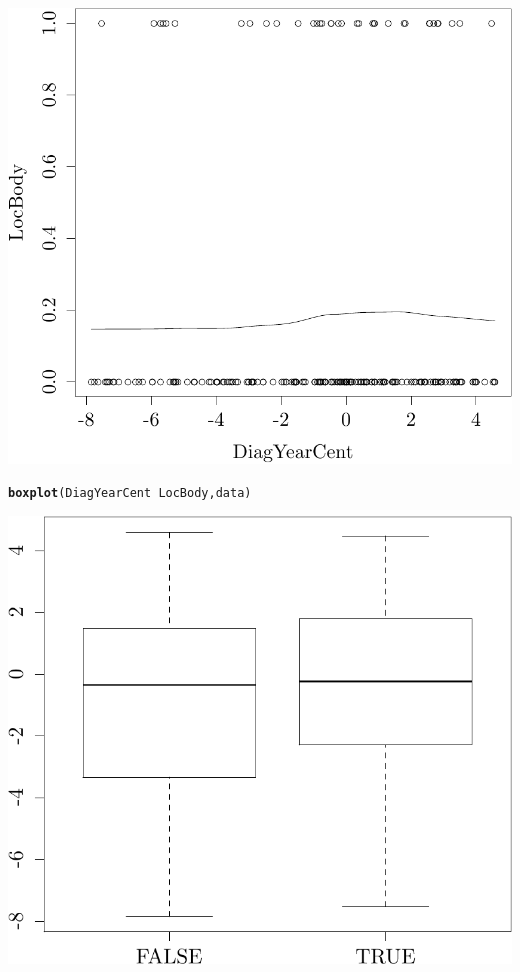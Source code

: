 \documentclass{article}\usepackage[]{graphicx}\usepackage[]{color}
\makeatletter
\def\maxwidth{ %
  \ifdim\Gin@nat@width>\linewidth
    \linewidth
  \else
    \Gin@nat@width
  \fi
}
\newcommand{\hlopt}[1]{\textcolor[rgb]{0,0,0}{#1}}%
\newcommand{\hlstd}[1]{\textcolor[rgb]{0.345,0.345,0.345}{#1}}%
\newcommand{\hlkwd}[1]{\textcolor[rgb]{0.737,0.353,0.396}{\textbf{#1}}}%
\newenvironment{kframe}{%
 \def\at@end@of@kframe{}%
 \ifinner\ifhmode%
  \def\at@end@of@kframe{\end{minipage}}%
  \begin{minipage}{\columnwidth}%
 \fi\fi%
 \def\FrameCommand##1{\hskip\@totalleftmargin \hskip-\fboxsep
 \colorbox{shadecolor}{##1}\hskip-\fboxsep
     \hskip-\linewidth \hskip-\@totalleftmargin \hskip\columnwidth}%
 \MakeFramed {\advance\hsize-\width
   \@totalleftmargin\z@ \linewidth\hsize
   \@setminipage}}%
 {\par\unskip\endMakeFramed%
 \at@end@of@kframe}
\newenvironment{knitrout}{}{} %
\makeatother
\begin{document}
\begin{knitrout}
{\centering \includegraphics[width=\maxwidth]{figure/05-eda-dod-check-4} 

}


\begin{kframe}\begin{alltt}
\hlkwd{boxplot}\hlstd{(DiagYearCent} \hlopt{~} \hlstd{LocBody, data)}
\end{alltt}
\end{kframe}

{\centering \includegraphics[width=\maxwidth]{figure/05-eda-dod-check-5} 

}
\end{knitrout}
\end{document}
